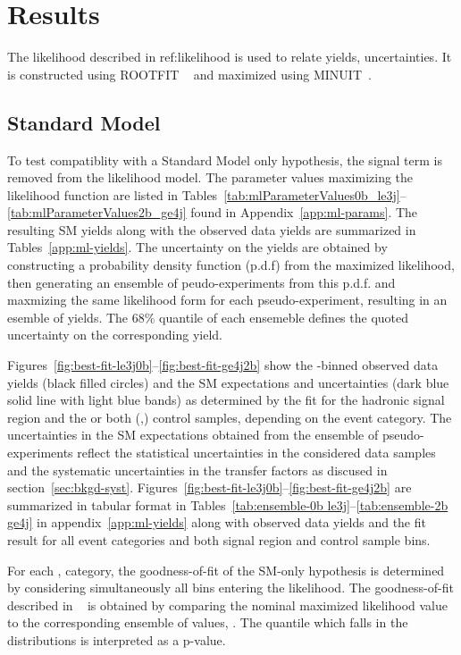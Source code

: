 \clearpage
\section{Results\label{sec:results}}

The likelihood described in ref:likelihood is used to
relate yields, uncertainties. It is constructed using ROOTFIT
~\cite{roofit} and maximized using MINUIT~\cite{James:1975dr}.

\subsection{Standard Model\label{sec:smInterp}}

To test compatiblity with a Standard Model only hypothesis,
the signal term is removed from the likelihood model. The parameter values 
maximizing the likelihood function are listed in 
Tables~\ref{tab:mlParameterValues0b_le3j}--\ref{tab:mlParameterValues2b_ge4j}
found in Appendix~\ref{app:ml-params}. The resulting SM yields
along with the observed data yields are summarized in Tables~\ref{app:ml-yields}. 
The uncertainty on the yields are obtained by constructing a probability density
function (p.d.f) from the maximized likelihood, then generating an
ensemble of peudo-experiments from this p.d.f. and maxmizing the same 
likelihood form for each pseudo-experiment, resulting in an esemble of yields.
The $68\%$ quantile of each ensemeble defines the quoted uncertainty on the 
corresponding yield.

Figures~\ref{fig:best-fit-le3j0b}--\ref{fig:best-fit-ge4j2b} show
the \scalht-binned observed data yields (black filled circles) and the
SM expectations and uncertainties (dark blue solid line with light
blue bands) as determined by the fit for the hadronic signal region
and the \mj or both (\mj,\gj) control samples, depending on the event
category. The uncertainties in the SM expectations obtained from the 
ensemble of pseudo-experiments reflect the statistical uncertainties in
the considered data samples and the systematic uncertainties
in the transfer factors as discused in section~\ref{sec:bkgd-syst}.
Figures~\ref{fig:best-fit-le3j0b}--\ref{fig:best-fit-ge4j2b} are summarized
in tabular format in Tables~\ref{tab:ensemble-0b le3j}--\ref{tab:ensemble-2b ge4j} 
in appendix~\ref{app:ml-yields} along with observed data yields and the fit 
result for all event categories and both signal region and control sample bins.

For each \nb, \njet category, the goodness-of-fit of the SM-only hypothesis 
is determined by considering simultaneously all \scalht bins entering
the likelihood. The goodness-of-fit described in ~\cite{Cowan:358560} is obtained
by comparing the nominal maximized likelihood value  to 
the corresponding ensemble of values, . The quantile which 
falls in the distributions is interpreted as a p-value.


